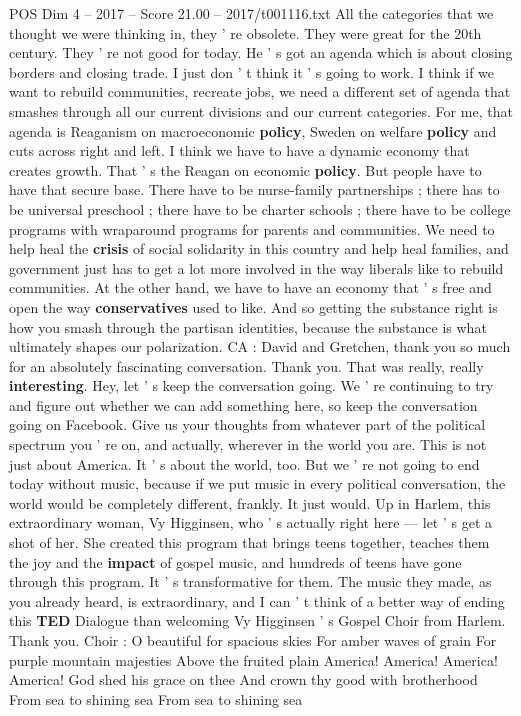 \begin{textsample}{POS Dim 4 – 2017 – Score 21.00 – 2017/t001116.txt}
All the categories that we thought we were thinking in, they ' re obsolete.
They were great for the 20th century.
They ' re not good for today.
He ' s got an agenda which is about closing borders and closing trade.
I just don ' t think it ' s going to work.
I think if we want to rebuild communities, recreate jobs, we need a different set of agenda that smashes through all our current divisions and our current categories.
For me, that agenda is Reaganism on macroeconomic \textbf{policy}, Sweden on welfare \textbf{policy} and cuts across right and left.
I think we have to have a dynamic economy that creates growth.
That ' s the Reagan on economic \textbf{policy}.
But people have to have that secure base.
There have to be nurse-family partnerships ; there has to be universal preschool ; there have to be charter schools ; there have to be college programs with wraparound programs for parents and communities.
We need to help heal the \textbf{crisis} of social solidarity in this country and help heal families, and government just has to get a lot more involved in the way liberals like to rebuild communities.
At the other hand, we have to have an economy that ' s free and open the way \textbf{conservatives} used to like.
And so getting the substance right is how you smash through the partisan identities, because the substance is what ultimately shapes our polarization.
CA : David and Gretchen, thank you so much for an absolutely fascinating conversation.
Thank you.
That was really, really \textbf{interesting}.
Hey, let ' s keep the conversation going.
We ' re continuing to try and figure out whether we can add something here, so keep the conversation going on Facebook.
Give us your thoughts from whatever part of the political spectrum you ' re on, and actually, wherever in the world you are.
This is not just about America.
It ' s about the world, too.
But we ' re not going to end today without music, because if we put music in every political conversation, the world would be completely different, frankly.
It just would.
Up in Harlem, this extraordinary woman, Vy Higginsen, who ' s actually right here — let ' s get a shot of her.
She created this program that brings teens together, teaches them the joy and the \textbf{impact} of gospel music, and hundreds of teens have gone through this program.
It ' s transformative for them.
The music they made, as you already heard, is extraordinary, and I can ' t think of a better way of ending this \textbf{TED} Dialogue than welcoming Vy Higginsen ' s Gospel Choir from Harlem.
Thank you.
Choir : O beautiful for spacious skies For amber waves of grain For purple mountain majesties Above the fruited plain America!
America!
America!
America!
God shed his grace on thee And crown thy good with brotherhood From sea to shining sea From sea to shining sea

\end{textsample}
